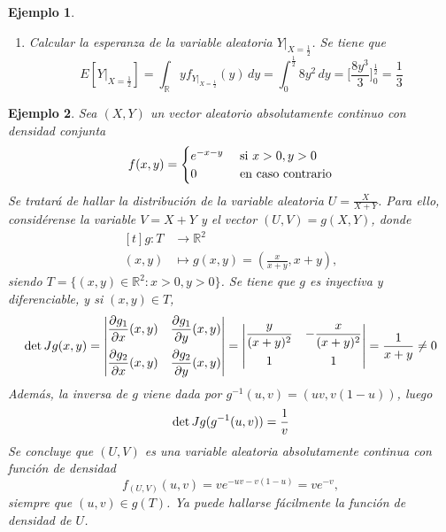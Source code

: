 \documentclass[11pt]{report}
\theoremstyle{mytheorem}
\theoremstyle{mydefinition}
\theoremstyle{myexample}
\newtheorem*{example}{Ejemplo}
\newcommand{\R}{\mathbb R}
\begin{document}
\begin{example}
\begin{enumerate}
    Por otra parte, si $0 < y <x_0$,
    \[f_{Y|_{X=x_0}}(y) = \frac{f(x_0,y)}{f_X(x_0)} = \frac{10yx_0^2}{5x_0^4} = \frac{2y}{x_0^2}\]
    En consecuencia,
    \[f_{Y|_{X=x_0}}(y) = \begin{cases}
        \displaystyle{\frac{2y}{x_0^2}} & $ si $ 0 < y < x_0 \\[10pt]
        0 & $ en caso contrario$
    \end{cases}\]
    \item \textit{Calcular la esperanza de la variable aleatoria $Y|_{X=\frac{1}{2}}$}. Se tiene que
    \[E[Y|_{X=\frac{1}{2}}] = \int_\R yf_{Y|_{X=\frac{1}{2}}}(y) \, dy = \int_0^\frac{1}{2}8y^2 \, dy = \biggl[\frac{8y^3}{3}\biggr]_0^\frac{1}{2} = \frac{1}{3}\]
\end{enumerate}
\end{example}

\begin{example}
Sea $(X,Y)$ un vector aleatorio absolutamente continuo con densidad conjunta
\[f(x,y) = \begin{cases}
    e^{-x-y} & $ si$ \ x>0,y>0 \\
    0 & $ en caso contrario$
\end{cases}\]
Se tratará de hallar la distribución de la variable aleatoria $U = \frac{X}{X+Y}$. Para ello, considérense la variable $V = X+Y$ y el vector $(U,V) = g(X,Y)$, donde 
\[\begin{aligned}[t]
    g \colon T &\longrightarrow \R^2 \\
    (x,y) &\longmapsto g(x,y) = \textstyle({\frac{x}{x+y}},x+y),
\end{aligned}\]
siendo $T = \{(x,y) \in \R^2 \colon x>0,y>0\}$. Se tiene que $g$ es inyectiva y diferenciable, y si $(x,y) \in T$,
\[\textup{det}\,Jg(x,y) = \begin{vmatrix}
    \displaystyle\frac{\partial g_1}{\partial x}(x,y) & \displaystyle\frac{\partial g_1}{\partial y}(x,y) \\[10pt]
    \displaystyle\frac{\partial g_2}{\partial x}(x,y) & \displaystyle\frac{\partial g_2}{\partial y}(x,y) \\ 
\end{vmatrix} = \begin{vmatrix}
    \displaystyle\frac{y}{(x+y)^2} & \displaystyle-\frac{x}{(x+y)^2} \\[10pt]
    1 & 1
\end{vmatrix} = \frac{1}{x+y} \neq 0\]
Además, la inversa de $g$ viene dada por $g^{-1}(u,v) = (uv,v(1-u))$, luego
\[\textup{det} \, Jg(g^{-1}(u,v)) = \frac{1}{v}\]
Se concluye que $(U,V)$ es una variable aleatoria absolutamente continua con función de densidad
\[f_{(U,V)}(u,v)=ve^{-uv-v(1-u)} = ve^{-v},\]
siempre que $(u,v) \in g(T)$. Ya puede hallarse fácilmente la función de densidad de $U$.
\end{example}
\end{document}
